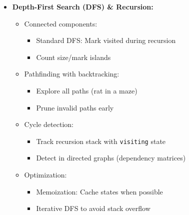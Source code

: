 \documentclass[a4paper,10pt]{book}
\begin{document}
\begin{itemize}
    \item \textbf{Depth-First Search (DFS) \& Recursion:}
    \begin{itemize}
        \item Connected components: 
        \begin{itemize}
            \item Standard DFS: Mark visited during recursion
            \item Count size/mark islands
        \end{itemize}
        \item Pathfinding with backtracking: 
        \begin{itemize}
            \item Explore all paths (rat in a maze)
            \item Prune invalid paths early
        \end{itemize}
        \item Cycle detection: 
        \begin{itemize}
            \item Track recursion stack with \texttt{visiting} state
            \item Detect in directed graphs (dependency matrices)
        \end{itemize}
        \item Optimization:
        \begin{itemize}
            \item Memoization: Cache states when possible
            \item Iterative DFS to avoid stack overflow
        \end{itemize}
    \end{itemize}
    

\end{itemize}
\end{document}
